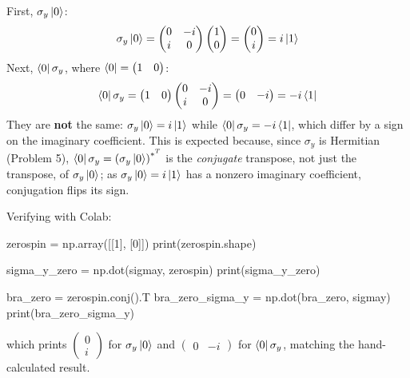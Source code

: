 \documentclass[a4paper, 10pt]{article}
\begin{document}
\begin{solution}
	First, \( \sigma_y \ket{0} \):
	\[
		\sigma_y \ket{0} = \begin{pmatrix}
			0 & -i \\
			i & 0
		\end{pmatrix}\begin{pmatrix}
			1 \\ 0
		\end{pmatrix} = \begin{pmatrix}
			0 \\ i
		\end{pmatrix} = i\ket{1}
	\]
	Next, \( \bra{0}\sigma_y \), where \( \bra{0} = \begin{pmatrix} 1 & 0 \end{pmatrix} \):
	\[
		\bra{0}\sigma_y = \begin{pmatrix}
			1 & 0
		\end{pmatrix}\begin{pmatrix}
			0 & -i \\
			i & 0
		\end{pmatrix} = \begin{pmatrix}
			0 & -i
		\end{pmatrix} = -i\bra{1}
	\]
	They are \textbf{not} the same: \( \sigma_y\ket{0} = i\ket{1} \) while \( \bra{0}\sigma_y = -i\bra{1} \), which differ by a sign on the imaginary coefficient.
	This is expected because, since \( \sigma_y \) is Hermitian (Problem 5), \( \bra{0}\sigma_y = \left(\sigma_y\ket{0}\right)^{*^T} \) is the \emph{conjugate} transpose, not just the transpose, of \( \sigma_y\ket{0} \); as \( \sigma_y\ket{0} = i\ket{1} \) has a nonzero imaginary coefficient, conjugation flips its sign.

	Verifying with Colab:
	\begin{codingbox}
zerospin = np.array([[1], [0]])
print(zerospin.shape)

sigma_y_zero = np.dot(sigmay, zerospin)
print(sigma_y_zero)

bra_zero = zerospin.conj().T
bra_zero_sigma_y = np.dot(bra_zero, sigmay)
print(bra_zero_sigma_y)
\end{codingbox}
	which prints \( \begin{pmatrix} 0 \\ i \end{pmatrix} \) for \( \sigma_y\ket{0} \) and \( \begin{pmatrix} 0 & -i \end{pmatrix} \) for \( \bra{0}\sigma_y \), matching the hand-calculated result.
\end{solution}



\end{document}

